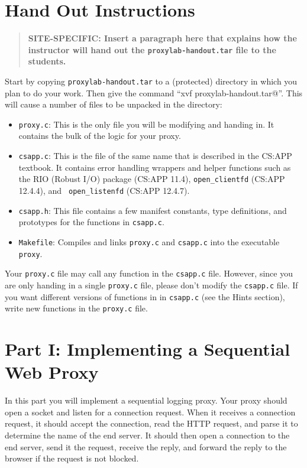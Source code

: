 \documentclass[11pt]{article}
\begin{document}
\section*{Hand Out Instructions}

\begin{quote}
\bf SITE-SPECIFIC: Insert a paragraph here that explains how the instructor
will hand out the \texttt{proxylab-handout.tar} file to the students. 
\end{quote}

Start by copying \texttt{proxylab-handout.tar} to a (protected) directory
in which you plan to do your work.  Then give the command
``\verb@tar xvf proxylab-handout.tar@''.  This will cause a number of files
to be unpacked in the directory:

\begin{itemize}
\item \texttt{proxy.c}: This is the only file you will be 
modifying and handing in. It contains the bulk of the logic
for your proxy.
\item \texttt{csapp.c}: This is the file of the same name that
is described in the CS:APP textbook. It contains error handling
wrappers and helper functions such as the RIO (Robust I/O) package
(CS:APP 11.4), \texttt{open\_clientfd} (CS:APP 12.4.4), and {\tt
open\_listenfd} (CS:APP 12.4.7).

\item \texttt{csapp.h}:  This file contains a few manifest constants, type 
definitions, and prototypes for the functions in \texttt{csapp.c}.

\item \texttt{Makefile}: Compiles and links \texttt{proxy.c} and 
\texttt{csapp.c} into the executable \texttt{proxy}.

\end{itemize}

Your \texttt{proxy.c} file may call any function in the
\texttt{csapp.c} file. However, since you are only handing in 
a single \texttt{proxy.c} file, please don't modify 
the \texttt{csapp.c} file. If you want different versions of 
functions in in \texttt{csapp.c} (see the Hints section), 
write new functions in the \texttt{proxy.c} file.


\section*{Part I: Implementing a Sequential Web Proxy}

In this part you will implement a sequential logging proxy.  Your
proxy should open a socket and listen for a connection request. When
it receives a connection request, it should accept the connection,
read the HTTP request, and parse it to determine the name of the end
server.  It should then open a connection to the end server, send it
the request, receive the reply, and forward the reply to the browser
if the request is not blocked.
\end{document}
